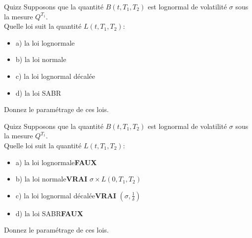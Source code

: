 \documentclass{beamer}
\begin{document}
\begin{frame}{Quizz}
Supposons que la quantité $B(t,T_1,T_2)$ est lognormal de volatilité $\sigma$ sous la mesure $Q^{T_1}$.\\
\vspace{0.5cm}
Quelle loi suit la quantité $L(t,T_1,T_2):$
\begin{itemize}
\item a) la loi lognormale
\item b) la loi normale
\item c) la loi lognormal décalée
\item d) la loi SABR
\end{itemize}
\vspace{0.5cm}
Donnez le paramétrage de ces lois.
\end{frame}


\begin{frame}{Quizz}
Supposons que la quantité $B(t,T_1,T_2)$ est lognormal de volatilité $\sigma$ sous la mesure $Q^{T_1}$.\\
\vspace{0.5cm}
Quelle loi suit la quantité $L(t,T_1,T_2):$
\begin{itemize}
\item a) la loi lognormale\textbf{\color{red}FAUX}
\item b) la loi normale\textbf{\color{green}VRAI} $\sigma \times L(0,T_1,T_2) $ 
\item c) la loi lognormal décalée\textbf{\color{green}VRAI} $(\sigma,\frac{1}{\delta})$
\item d) la loi SABR\textbf{\color{red}FAUX}
\end{itemize}
\vspace{0.5cm}
Donnez le paramétrage de ces lois.
\end{frame}
\end{document}
